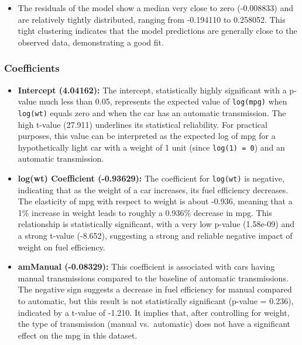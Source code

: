 \documentclass[
  letterpaper,
  DIV=11,
  numbers=noendperiod]{scrreport}
\providecommand{\tightlist}{%
  \setlength{\itemsep}{0pt}\setlength{\parskip}{0pt}}\usepackage{longtable,booktabs,array}
\begin{document}
\begin{itemize}
\tightlist
\item
  The residuals of the model show a median very close to zero
  (-0.008833) and are relatively tightly distributed, ranging from
  -0.194110 to 0.258052. This tight clustering indicates that the model
  predictions are generally close to the observed data, demonstrating a
  good fit.
\end{itemize}

\subsubsection{Coefficients}\label{coefficients-1}

\begin{itemize}
\item
  \textbf{Intercept (4.04162):} The intercept, statistically highly
  significant with a p-value much less than 0.05, represents the
  expected value of \texttt{log(mpg)} when \texttt{log(wt)} equals zero
  and when the car has an automatic transmission. The high t-value
  (27.911) underlines its statistical reliability. For practical
  purposes, this value can be interpreted as the expected log of mpg for
  a hypothetically light car with a weight of 1 unit (since
  \texttt{log(1)\ =\ 0}) and an automatic transmission.
\item
  \textbf{log(wt) Coefficient (-0.93629):} The coefficient for
  \texttt{log(wt)} is negative, indicating that as the weight of a car
  increases, its fuel efficiency decreases. The elasticity of mpg with
  respect to weight is about -0.936, meaning that a 1\% increase in
  weight leads to roughly a 0.936\% decrease in mpg. This relationship
  is statistically significant, with a very low p-value (1.58e-09) and a
  strong t-value (-8.652), suggesting a strong and reliable negative
  impact of weight on fuel efficiency.
\item
  \textbf{amManual (-0.08329):} This coefficient is associated with cars
  having manual transmissions compared to the baseline of automatic
  transmissions. The negative sign suggests a decrease in fuel
  efficiency for manual compared to automatic, but this result is not
  statistically significant (p-value = 0.236), indicated by a t-value of
  -1.210. It implies that, after controlling for weight, the type of
  transmission (manual vs.~automatic) does not have a significant effect
  on the mpg in this dataset.
\end{itemize}
\end{document}
